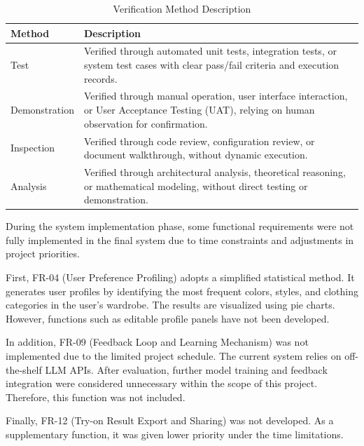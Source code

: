 \begin{table}[ht]
\centering
\small
\caption{Verification Method Description}
\label{tab:method_fr}
\renewcommand{\arraystretch}{1.5}
\begin{tabular}{p{3.2cm}p{11.6cm}}
    \toprule
    \textbf{Method} & \textbf{Description}\\
    \midrule
    Test & 
    Verified through automated unit tests, integration tests, or system test cases with clear pass/fail criteria and execution records.
      \\

    Demonstration      &
    Verified through manual operation, user interface interaction, or User Acceptance Testing (UAT), relying on human observation for confirmation. 
    \\

    Inspection &
    Verified through code review, configuration review, or document walkthrough, without dynamic execution.
      \\

    Analysis      &
    Verified through architectural analysis, theoretical reasoning, or mathematical modeling, without direct testing or demonstration.
      \\
    
    \bottomrule
\end{tabular}
\end{table}

\newpage
During the system implementation phase, some functional requirements were not fully implemented in the final system due to time constraints and adjustments in project priorities.

First, FR-04 (User Preference Profiling) adopts a simplified statistical method. It generates user profiles by identifying the most frequent colors, styles, and clothing categories in the user’s wardrobe. The results are visualized using pie charts. However, functions such as editable profile panels have not been developed.

In addition, FR-09 (Feedback Loop and Learning Mechanism) was not implemented due to the limited project schedule. The current system relies on off-the-shelf LLM APIs. After evaluation, further model training and feedback integration were considered unnecessary within the scope of this project. Therefore, this function was not included.

Finally, FR-12 (Try-on Result Export and Sharing) was not developed. As a supplementary function, it was given lower priority under the time limitations.

